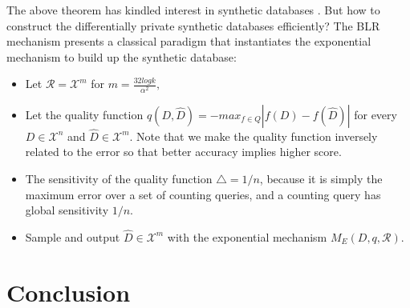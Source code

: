 \documentclass[a4paper, 11pt]{article} %
\begin{document}
The above theorem has kindled interest in synthetic databases \cite{blum2013learning, dwork2009complexity}. But how to construct the differentially private synthetic databases efficiently? The BLR mechanism \cite{blum2013learning} presents a classical paradigm that instantiates the exponential mechanism to build up the synthetic database: 
\begin{itemize}
\item Let $\mathcal{R} = \mathcal{X}^m$ for $m = \frac{32logk}{\alpha^2},$
\item Let the quality function $q(D, \hat{D}) = -max_{f\in Q} | f(D) - f(\hat{D}) |$ for every $D \in \mathcal{X}^n$ and $\hat{D} \in \mathcal{X}^m$. Note that we make the quality function inversely related to the error so that better accuracy implies higher score.
\item The sensitivity of the quality function $\triangle = 1/n$, because it is simply the maximum error over a set of counting queries, and a counting query  has global sensitivity $1/n$.
\item Sample and output $\hat{D} \in \mathcal{X}^m$ with the exponential mechanism $M_E(D, q, \mathcal{R})$.
\end{itemize}









\section*{Conclusion}










\end{document}
